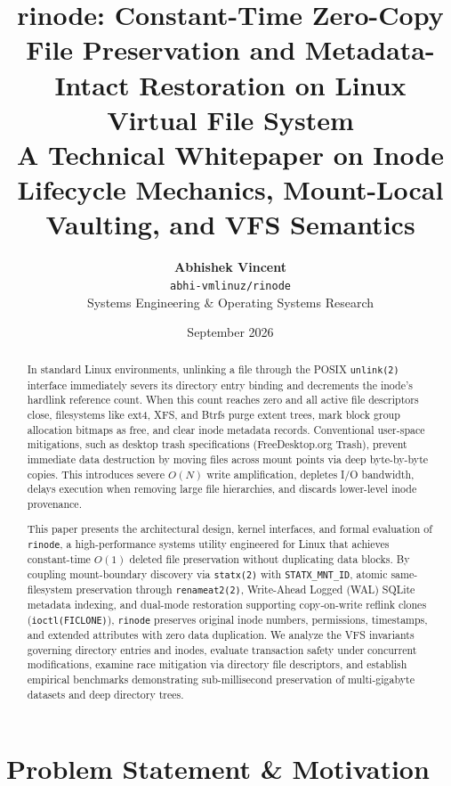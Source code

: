 \documentclass[11pt,a4paper]{article}
\title{\LARGE\textbf{rinode: Constant-Time Zero-Copy File Preservation and Metadata-Intact Restoration on Linux Virtual File System}\\[0.4em]
\large A Technical Whitepaper on Inode Lifecycle Mechanics, Mount-Local Vaulting, and VFS Semantics}
\author{\textbf{Abhishek Vincent} \\
\texttt{abhi-vmlinuz/rinode} \\
\small Systems Engineering \& Operating Systems Research}
\date{September 2026}
\begin{document}
\maketitle
\thispagestyle{empty}

\begin{abstract}
\noindent In standard Linux environments, unlinking a file through the POSIX \texttt{unlink(2)} interface immediately severs its directory entry binding and decrements the inode's hardlink reference count. When this count reaches zero and all active file descriptors close, filesystems like ext4, XFS, and Btrfs purge extent trees, mark block group allocation bitmaps as free, and clear inode metadata records. Conventional user-space mitigations, such as desktop trash specifications (FreeDesktop.org Trash), prevent immediate data destruction by moving files across mount points via deep byte-by-byte copies. This introduces severe $O(N)$ write amplification, depletes I/O bandwidth, delays execution when removing large file hierarchies, and discards lower-level inode provenance. 

This paper presents the architectural design, kernel interfaces, and formal evaluation of \texttt{rinode}, a high-performance systems utility engineered for Linux that achieves constant-time $O(1)$ deleted file preservation without duplicating data blocks. By coupling mount-boundary discovery via \texttt{statx(2)} with \texttt{STATX\_MNT\_ID}, atomic same-filesystem preservation through \texttt{renameat2(2)}, Write-Ahead Logged (WAL) SQLite metadata indexing, and dual-mode restoration supporting copy-on-write reflink clones (\texttt{ioctl(FICLONE)}), \texttt{rinode} preserves original inode numbers, permissions, timestamps, and extended attributes with zero data duplication. We analyze the VFS invariants governing directory entries and inodes, evaluate transaction safety under concurrent modifications, examine race mitigation via directory file descriptors, and establish empirical benchmarks demonstrating sub-millisecond preservation of multi-gigabyte datasets and deep directory trees.
\end{abstract}

\vspace{1em}
\tableofcontents
\newpage

\section{Problem Statement \& Motivation}
\end{document}
